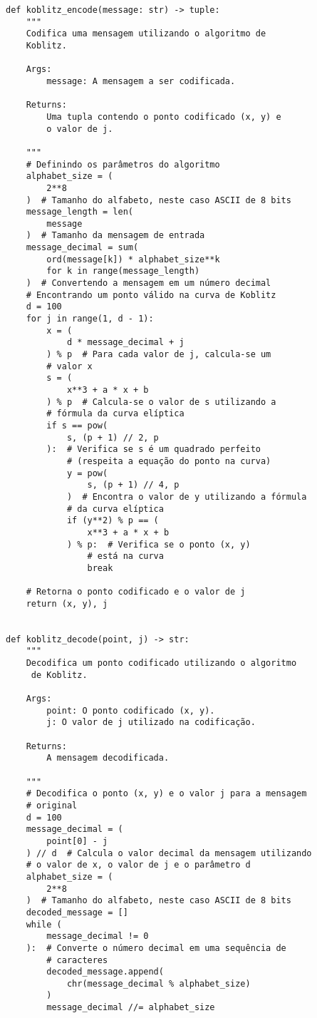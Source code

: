  \label{anexo:efaa994a-3caf-4704-bf42-c98f2418dab0}
\begin{verbatim}
def koblitz_encode(message: str) -> tuple:
    """
    Codifica uma mensagem utilizando o algoritmo de
    Koblitz.

    Args:
        message: A mensagem a ser codificada.

    Returns:
        Uma tupla contendo o ponto codificado (x, y) e
        o valor de j.

    """
    # Definindo os parâmetros do algoritmo
    alphabet_size = (
        2**8
    )  # Tamanho do alfabeto, neste caso ASCII de 8 bits
    message_length = len(
        message
    )  # Tamanho da mensagem de entrada
    message_decimal = sum(
        ord(message[k]) * alphabet_size**k
        for k in range(message_length)
    )  # Convertendo a mensagem em um número decimal
    # Encontrando um ponto válido na curva de Koblitz
    d = 100
    for j in range(1, d - 1):
        x = (
            d * message_decimal + j
        ) % p  # Para cada valor de j, calcula-se um
        # valor x
        s = (
            x**3 + a * x + b
        ) % p  # Calcula-se o valor de s utilizando a
        # fórmula da curva elíptica
        if s == pow(
            s, (p + 1) // 2, p
        ):  # Verifica se s é um quadrado perfeito
            # (respeita a equação do ponto na curva)
            y = pow(
                s, (p + 1) // 4, p
            )  # Encontra o valor de y utilizando a fórmula
            # da curva elíptica
            if (y**2) % p == (
                x**3 + a * x + b
            ) % p:  # Verifica se o ponto (x, y)
                # está na curva
                break

    # Retorna o ponto codificado e o valor de j
    return (x, y), j


def koblitz_decode(point, j) -> str:
    """
    Decodifica um ponto codificado utilizando o algoritmo
     de Koblitz.

    Args:
        point: O ponto codificado (x, y).
        j: O valor de j utilizado na codificação.

    Returns:
        A mensagem decodificada.

    """
    # Decodifica o ponto (x, y) e o valor j para a mensagem
    # original
    d = 100
    message_decimal = (
        point[0] - j
    ) // d  # Calcula o valor decimal da mensagem utilizando
    # o valor de x, o valor de j e o parâmetro d
    alphabet_size = (
        2**8
    )  # Tamanho do alfabeto, neste caso ASCII de 8 bits
    decoded_message = []
    while (
        message_decimal != 0
    ):  # Converte o número decimal em uma sequência de
        # caracteres
        decoded_message.append(
            chr(message_decimal % alphabet_size)
        )
        message_decimal //= alphabet_size


\end{verbatim}

